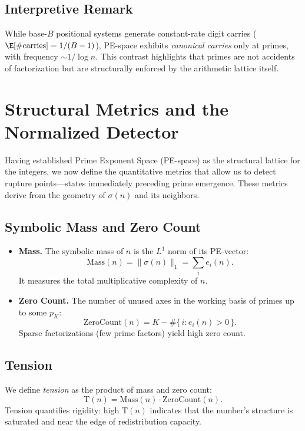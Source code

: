 \documentclass[11pt]{article}
\theoremstyle{plain}
\theoremstyle{definition}
\newcommand{\mass}{\mathrm{Mass}}                            %
\newcommand{\zcount}{\mathrm{ZeroCount}}                    %
\newcommand{\tension}{\mathrm{T}}                           %
\begin{document}
\subsection{Interpretive Remark}
While base-$B$ positional systems generate constant-rate digit carries ($\E[\#\text{carries}] = 1/(B-1)$), PE-space exhibits \emph{canonical carries} only at primes, with frequency $\sim 1/\log n$. This contrast highlights that primes are not accidents of factorization but are structurally enforced by the arithmetic lattice itself.

\section{Structural Metrics and the Normalized Detector}

Having established Prime Exponent Space (PE-space) as the structural lattice for the integers, we now define the quantitative metrics that allow us to detect rupture points—states immediately preceding prime emergence. These metrics derive from the geometry of $\sigma(n)$ and its neighbors.

\subsection{Symbolic Mass and Zero Count}
\begin{itemize}
  \item \textbf{Mass.} The symbolic mass of $n$ is the $L^1$ norm of its PE-vector:
  \[
    \mass(n) = \|\sigma(n)\|_1 = \sum_i e_i(n).
  \]
  It measures the total multiplicative complexity of $n$.

  \item \textbf{Zero Count.} The number of unused axes in the working basis of primes up to some $p_K$:
  \[
    \zcount(n) = K - \#\{\,i : e_i(n) > 0\,\}.
  \]
  Sparse factorizations (few prime factors) yield high zero count.
\end{itemize}

\subsection{Tension}
We define \emph{tension} as the product of mass and zero count:
\[
\tension(n) = \mass(n) \cdot \zcount(n).
\]
Tension quantifies rigidity: high $\tension(n)$ indicates that the number’s structure is saturated and near the edge of redistribution capacity.
\end{document}
